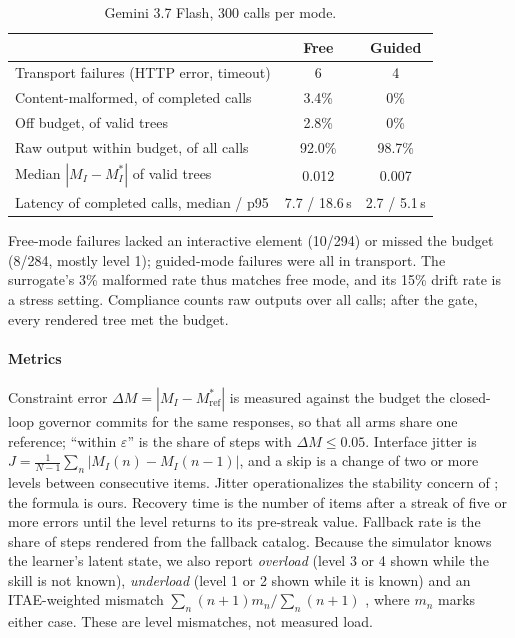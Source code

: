 \documentclass[conference]{IEEEtran}
\begin{document}
\begin{table}[t]
\centering
\caption{Gemini 3.7 Flash, 300 calls per mode.}
\label{tab:gemini}
\begin{tabular}{lcc}
\toprule
 & Free & Guided\\
\midrule
Transport failures (HTTP error, timeout) & 6 & 4\\
Content-malformed, of completed calls & 3.4\% & 0\%\\
Off budget, of valid trees & 2.8\% & 0\%\\
Raw output within budget, of all calls & 92.0\% & 98.7\%\\
Median $|M_I-M_I^*|$ of valid trees & 0.012 & 0.007\\
Latency of completed calls, median / p95 & 7.7 / 18.6\,s & 2.7 / 5.1\,s\\
\bottomrule
\end{tabular}
\end{table}

Free-mode failures lacked an interactive element (10/294) or missed the
budget (8/284, mostly level 1); guided-mode failures were all in transport. The surrogate's 3\% malformed
rate thus matches free mode, and its 15\% drift rate is a stress setting.
Compliance counts raw outputs over all calls; after the gate, every
rendered tree met the budget.

\paragraph*{Metrics}
Constraint error $\Delta M=|M_I-M^*_{\mathrm{ref}}|$ is measured against the
budget the closed-loop governor commits for the same responses, so that all
arms share one reference; ``within $\varepsilon$'' is the share of steps with
$\Delta M\le 0.05$. Interface jitter is
$J=\frac{1}{N-1}\sum_n|M_I(n)-M_I(n-1)|$, and a skip is a change of two or
more levels between consecutive items. Jitter operationalizes the
stability concern of \cite{gajos2008predictability}; the formula is ours.
Recovery time is the number of items after a streak of five or more errors
until the level returns to its pre-streak value. Fallback rate is the share
of steps rendered from the fallback catalog. Because the simulator knows the
learner's latent state, we also report \emph{overload} (level 3 or 4 shown
while the skill is not known), \emph{underload} (level 1 or 2 shown while it
is known) and an ITAE-weighted mismatch $\sum_n (n{+}1)m_n/\sum_n(n{+}1)$
\cite{graham1953itae}, where $m_n$ marks either case. These are level
mismatches, not measured load.
\end{document}
